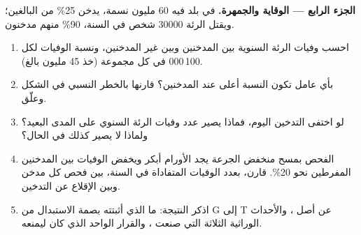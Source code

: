 \begin{problem}
\medskip
\noindent\textbf{الجزء الرابع --- الوقاية والجمهرة.}
في بلد فيه 60 مليون نسمة، يدخن 25\% من البالغين؛ ويقتل  الرئة
$\num{30000}$ شخص في السنة، 90\% منهم مدخنون.
\begin{enumerate}[resume]
  \item احسب وفيات  الرئة السنوية بين المدخنين وبين غير
        المدخنين، ونسبة الوفيات لكل 100\,000 في كل مجموعة (خذ 45
        مليون بالغ).
  \item بأي عامل تكون النسبة أعلى عند المدخنين؟ قارنها بالخطر النسبي
        في الشكل وعلّق.
  \item لو اختفى التدخين اليوم، فماذا يصير عدد وفيات  الرئة
        السنوي على المدى البعيد؟ ولماذا لا يصير كذلك في الحال؟
  \item الفحص بمسح منخفض الجرعة يجد الأورام أبكر ويخفض الوفيات بين
        المدخنين المفرطين نحو 20\%. قارن، بعدد الوفيات المتفاداة في
        السنة، بين فحص كل مدخن وبين الإقلاع عن التدخين.
  \item اذكر النتيجة: ما الذي أثبتته بصمة الاستبدال من G إلى T عن أصل
         ، والأحداث الوراثية الثلاثة التي صنعت ،
        والقرار الواحد الذي كان ليمنعه.
\end{enumerate}
\end{problem}
